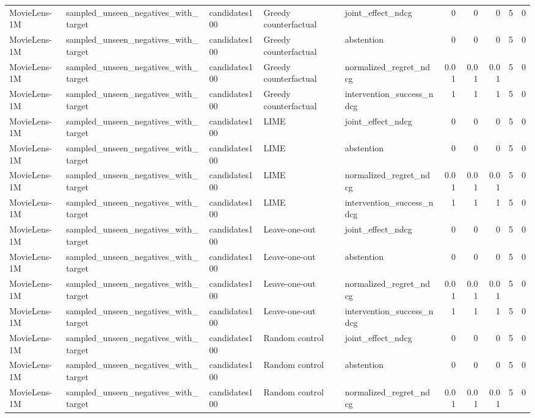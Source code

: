 \begin{table}[t]
{\begin{tabular}{lllllrrrrr}
MovieLens-1M & sampled\_unseen\_negatives\_with\_target & candidates100 & Greedy counterfactual & joint\_effect\_ndcg & 0 & 0 & 0 & 5 & 0 \\
MovieLens-1M & sampled\_unseen\_negatives\_with\_target & candidates100 & Greedy counterfactual & abstention & 0 & 0 & 0 & 5 & 0 \\
MovieLens-1M & sampled\_unseen\_negatives\_with\_target & candidates100 & Greedy counterfactual & normalized\_regret\_ndcg & 0.01 & 0.01 & 0.01 & 5 & 0 \\
MovieLens-1M & sampled\_unseen\_negatives\_with\_target & candidates100 & Greedy counterfactual & intervention\_success\_ndcg & 1 & 1 & 1 & 5 & 0 \\
MovieLens-1M & sampled\_unseen\_negatives\_with\_target & candidates100 & LIME & joint\_effect\_ndcg & 0 & 0 & 0 & 5 & 0 \\
MovieLens-1M & sampled\_unseen\_negatives\_with\_target & candidates100 & LIME & abstention & 0 & 0 & 0 & 5 & 0 \\
MovieLens-1M & sampled\_unseen\_negatives\_with\_target & candidates100 & LIME & normalized\_regret\_ndcg & 0.01 & 0.01 & 0.01 & 5 & 0 \\
MovieLens-1M & sampled\_unseen\_negatives\_with\_target & candidates100 & LIME & intervention\_success\_ndcg & 1 & 1 & 1 & 5 & 0 \\
MovieLens-1M & sampled\_unseen\_negatives\_with\_target & candidates100 & Leave-one-out & joint\_effect\_ndcg & 0 & 0 & 0 & 5 & 0 \\
MovieLens-1M & sampled\_unseen\_negatives\_with\_target & candidates100 & Leave-one-out & abstention & 0 & 0 & 0 & 5 & 0 \\
MovieLens-1M & sampled\_unseen\_negatives\_with\_target & candidates100 & Leave-one-out & normalized\_regret\_ndcg & 0.01 & 0.01 & 0.01 & 5 & 0 \\
MovieLens-1M & sampled\_unseen\_negatives\_with\_target & candidates100 & Leave-one-out & intervention\_success\_ndcg & 1 & 1 & 1 & 5 & 0 \\
MovieLens-1M & sampled\_unseen\_negatives\_with\_target & candidates100 & Random control & joint\_effect\_ndcg & 0 & 0 & 0 & 5 & 0 \\
MovieLens-1M & sampled\_unseen\_negatives\_with\_target & candidates100 & Random control & abstention & 0 & 0 & 0 & 5 & 0 \\
MovieLens-1M & sampled\_unseen\_negatives\_with\_target & candidates100 & Random control & normalized\_regret\_ndcg & 0.01 & 0.01 & 0.01 & 5 & 0 \\

\end{tabular}}
\end{table}

